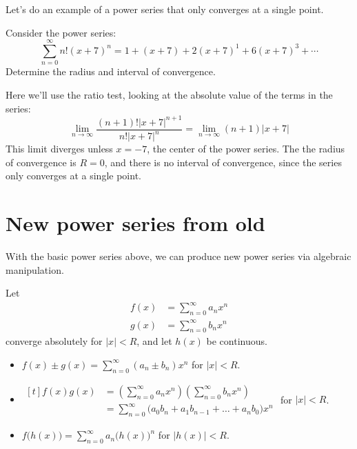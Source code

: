 \documentclass{ximera}
\begin{document}
Let's do an example of a power series that only converges at a single
point.

\begin{example}
  Consider the power series:
  \[
  \sum_{n=0}^\infty n!(x+7)^n = 1 + (x+7) + 2(x+7)^1 + 6(x+7)^3 + \cdots
  \]
  Determine the radius and interval of convergence.
  \begin{explanation}
    Here we'll use the ratio test, looking at the absolute value of
    the terms in the series:
    \[
    \lim_{n\to\infty} \frac{(n+1)!|x+7|^{n+1}}{n!|x+7|^n}= \lim_{n\to\infty} (n+1)|x+7|
    \]
    This limit diverges unless $x=-7$, the center of the power
    series. The the radius of convergence is $R=0$, and there is no
    interval of convergence, since the series only converges at a
    single point.
  \end{explanation}
\end{example}



\section{New power series from old}

With the basic power series above, we can produce new power series via
algebraic manipulation.

\begin{theorem}
  Let
  \begin{align*}
    f(x) &= \sum_{n=0}^\infty a_nx^n\\
    g(x) &= \sum_{n=0}^\infty b_nx^n
  \end{align*}
  converge absolutely for $|x|<R$, and let $h(x)$ be continuous.
  \begin{itemize}
	\item $f(x)\pm g(x) = \sum_{n=0}^\infty (a_n\pm b_n)x^n$ \quad for $|x|<R$.
	\item $\begin{aligned}[t]
	f(x)g(x) &= \left(\sum_{n=0}^\infty a_nx^n\right)\left(\sum_{n=0}^\infty b_nx^n\right)\\
	      &= \sum_{n=0}^\infty\big(a_0b_n+a_1b_{n-1}+\dots + a_nb_0\big)x^n
		\end{aligned}$ for $|x|<R$.%
	
	\item $f\big(h(x)\big) = \sum_{n=0}^\infty a_n\big(h(x)\big)^n$ \quad for $|h(x)|<R$.

  \end{itemize}
\end{theorem}
\end{document}
